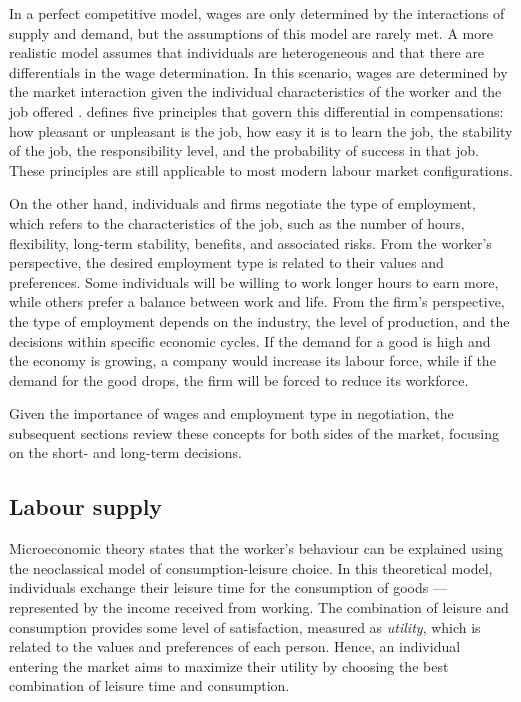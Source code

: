 In a perfect competitive model, wages are only determined by the interactions of supply and demand, but the assumptions of this model are rarely met. A more realistic model assumes that individuals are heterogeneous and that there are differentials in the wage determination. In this scenario, wages are determined by the market interaction given the individual characteristics of the worker and the job offered \citep{Kaufman2003}. \citet{Smith1910} defines five principles that govern this differential in compensations: how pleasant or unpleasant is the job, how easy it is to learn the job, the stability of the job, the responsibility level, and the probability of success in that job. These principles are still applicable to most modern labour market configurations. 

On the other hand, individuals and firms negotiate the type of employment, which refers to the characteristics of the job, such as the number of hours, flexibility, long-term stability, benefits, and associated risks. From the worker's perspective, the desired employment type is related to their values and preferences. Some individuals will be willing to work longer hours to earn more, while others prefer a balance between work and life. From the firm's perspective, the type of employment depends on the industry, the level of production, and the decisions within specific economic cycles. If the demand for a good is high and the economy is growing, a company would increase its labour force, while if the demand for the good drops, the firm will be forced to reduce its workforce. 

Given the importance of wages and employment type in negotiation, the subsequent sections review these concepts for both sides of the market, focusing on the short- and long-term decisions.

\subsection{Labour supply}

Microeconomic theory states that the worker's behaviour can be explained using the neoclassical model of consumption-leisure choice. In this theoretical model, individuals exchange their leisure time for the consumption of goods —represented by the income received from working. The combination of leisure and consumption provides some level of satisfaction, measured as \textit{utility}, which is related to the values and preferences of each person. Hence, an individual entering the market aims to maximize their utility by choosing the best combination of leisure time and consumption. 

